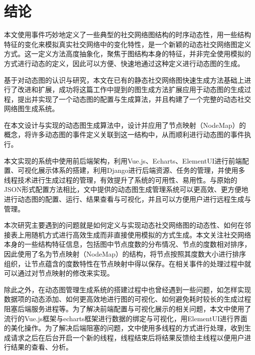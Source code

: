 
\chapter{结论}
\label{cha:chapter99}

本文使用事件巧妙地定义了一些典型的社交网络图结构的时序动态性，用一些结构特征的变化来模拟真实社交网络中的变化特性，是一个新颖的动态社交网络图定义方式。这一定义方法高度抽象化，聚焦于图结构本身的特征，并非完全使用模拟的方式进行动态的定义，因此可以方便、快速地通过这种定义进行动态图的生成。

基于对动态图的认识与研究，本文在已有的静态社交网络图快速生成方法\cite{FastSGG}基础上进行了改进和扩展，成功将这篇工作中提到的图生成方法扩展应用于动态图的生成过程，提出并实现了一个动态图的配置与生成算法，并且构建了一个完整的动态社交网络图生成系统。

在本文设计与实现的动态图生成算法中，设计并应用了节点映射（NodeMap）的概念，将许多动态图的事件定义关联到这一结构中，从而顺利进行动态图的事件执行。


本文实现的系统中使用前后端架构，利用Vue.js、Echarts、ElementUI进行前端配置、可视化展示体系的搭建，利用Django进行后端资源、任务的管理，并使用多线程技术进行生成过程的管理，有效提升了系统的可用性、易用性。与原始的JSON形式配置方法相比，文中提供的动态图生成管理系统可以更高效、更方便地进行动态图的配置、运行、结果查看与可视化，并且可以方便用户进行远程生成与管理。


本次研究主要遇到的问题就是如何定义与实现动态社交网络图的动态性、如何在邻接表上用随机方式进行高效生成而非直接使用模拟的方式生成。本文关注社交网络本身的一些结构特征信息，包括图中节点度数的分布情况、节点的度数相对排序，因此使用了名为节点映射（NodeMap）的结构，将节点按照其度数大小进行排序组织，让节点蕴含的度数特性在节点映射中得以保存。在相关事件的处理过程中就可以通过对节点映射的修改来实现。

除此之外，在动态图管理生成系统的搭建过程中也曾经遇到一些问题，如怎样实现数据项的动态添加、如何更高效地进行图的可视化、如何避免耗时较长的生成过程阻塞后端服务进程等。为了解决前端配置与可视化展示的相关问题，本文中使用了流行的Vue.js框架与echarts框架进行数据的绑定与可视化，用ElementUI进行界面的美化操作。为了解决后端阻塞的问题，文中使用多线程的方式进行处理，收到生成请求之后在后台开启一个新的线程，线程结束后将结果反馈给主线程以便用户进行结果的查看、分析。

